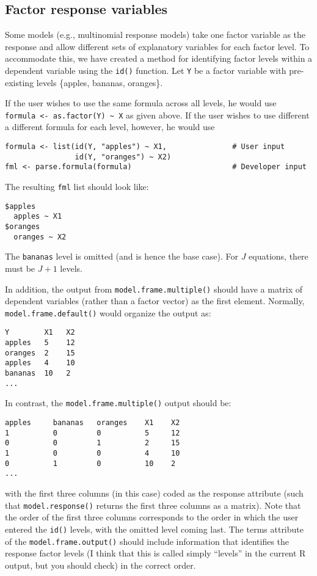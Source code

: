 \documentclass[oneside,letterpaper,12pt]{article}
\begin{document}
\subsection{Factor response variables}  

Some models (e.g., multinomial response models) take one factor
variable as the response and allow different sets of explanatory
variables for each factor level.  To accommodate this, we have created
a method for identifying factor levels within a dependent variable
using the {\tt id()} function.  Let {\tt Y} be a factor variable with
pre-existing levels \{apples, bananas, oranges\}.  

If the user wishes to use the same formula across all levels, he would
use \\ \verb|formula <- as.factor(Y) ~ X| as given above.  If the user
wishes to use different a different formula for each level, however,
he would use
\begin{verbatim}
formula <- list(id(Y, "apples") ~ X1,               # User input
                id(Y, "oranges") ~ X2) 
fml <- parse.formula(formula)                       # Developer input
\end{verbatim}  
The resulting {\tt fml} list should look like:  
\begin{verbatim}  
$apples
  apples ~ X1
$oranges
  oranges ~ X2
\end{verbatim}
The {\tt bananas} level is omitted (and is hence the base case).  
For $J$ equations, there must be $J + 1$ levels.

In addition, the output from {\tt model.frame.multiple()} should have
a matrix of dependent variables (rather than a factor vector) as the
first element.  Normally, {\tt model.frame.default()} would organize
the output as:  
\begin{verbatim}
Y        X1   X2
apples   5    12
oranges  2    15
apples   4    10
bananas  10   2
...
\end{verbatim}  
In contrast, the {\tt model.frame.multiple()} output should be:  
\begin{verbatim}
apples     bananas   oranges    X1    X2
1          0         0          5     12
0          0         1          2     15
1          0         0          4     10
0          1         0          10    2
...
\end{verbatim}  
with the first three columns (in this case) coded as the response
attribute (such that {\tt model.response()} returns the first three
columns as a matrix).  Note that the order of the first three columns
corresponds to the order in which the user entered the {\tt id()}
levels, with the omitted level coming last.  The terms attribute of
the {\tt model.frame.output()} should include information that
identifies the response factor levels (I think that this is called
simply ``levels'' in the current R output, but you should check) in
the correct order.  
\end{document}
